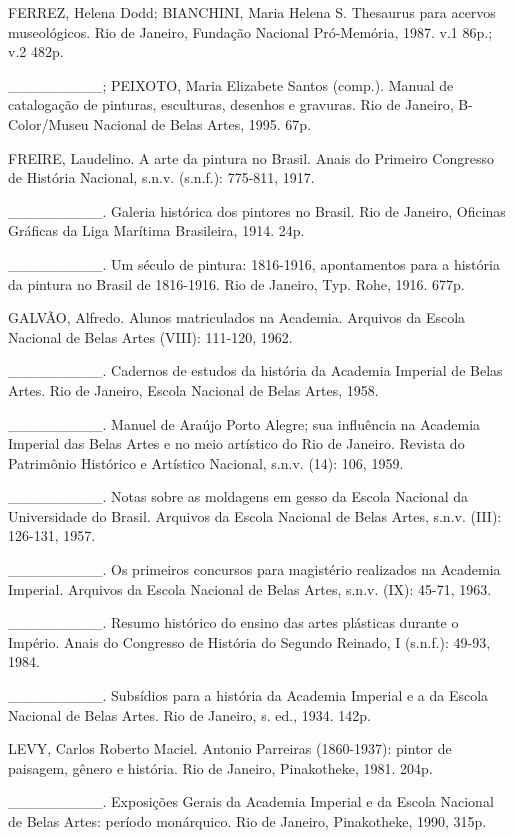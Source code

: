 FERREZ, Helena Dodd; BIANCHINI, Maria Helena S. Thesaurus para acervos museológicos. Rio de Janeiro, Fundação Nacional Pró-Memória, 1987. v.1 86p.; v.2 482p.

\_\_\_\_\_\_\_\_\_; PEIXOTO, Maria Elizabete Santos (comp.). Manual de catalogação de pinturas, esculturas, desenhos e gravuras. Rio de Janeiro, B-Color/Museu Nacional de Belas Artes, 1995. 67p.

FREIRE, Laudelino. A arte da pintura no Brasil. Anais do Primeiro Congresso de História Nacional, s.n.v. (s.n.f.): 775-811, 1917.

\_\_\_\_\_\_\_\_\_. Galeria histórica dos pintores no Brasil. Rio de Janeiro, Oficinas Gráficas da Liga Marítima Brasileira, 1914. 24p.

\_\_\_\_\_\_\_\_\_. Um século de pintura: 1816-1916, apontamentos para a história da pintura no Brasil de 1816-1916. Rio de Janeiro, Typ. Rohe, 1916. 677p.

GALVÃO, Alfredo. Alunos matriculados na Academia. Arquivos da Escola Nacional de Belas Artes (VIII): 111-120, 1962.

\_\_\_\_\_\_\_\_\_. Cadernos de estudos da história da Academia Imperial de Belas Artes. Rio de Janeiro, Escola Nacional de Belas Artes, 1958.

\_\_\_\_\_\_\_\_\_. Manuel de Araújo Porto Alegre; sua influência na Academia Imperial das Belas Artes e no meio artístico do Rio de Janeiro. Revista do Patrimônio Histórico e Artístico Nacional, s.n.v. (14): 106, 1959.

\_\_\_\_\_\_\_\_\_. Notas sobre as moldagens em gesso da Escola Nacional da Universidade do Brasil. Arquivos da Escola Nacional de Belas Artes, s.n.v. (III): 126-131, 1957.

\_\_\_\_\_\_\_\_\_. Os primeiros concursos para magistério realizados na Academia Imperial. Arquivos da Escola Nacional de Belas Artes, s.n.v. (IX): 45-71, 1963.

\_\_\_\_\_\_\_\_\_. Resumo histórico do ensino das artes plásticas durante o Império. Anais do Congresso de História do Segundo Reinado, I (s.n.f.): 49-93, 1984.

\_\_\_\_\_\_\_\_\_. Subsídios para a história da Academia Imperial e a da Escola Nacional de Belas Artes. Rio de Janeiro, s. ed., 1934. 142p.

LEVY, Carlos Roberto Maciel. Antonio Parreiras (1860-1937): pintor de paisagem, gênero e história. Rio de Janeiro, Pinakotheke, 1981. 204p.

\_\_\_\_\_\_\_\_\_. Exposições Gerais da Academia Imperial e da Escola Nacional de Belas Artes: período monárquico. Rio de Janeiro, Pinakotheke, 1990, 315p.

